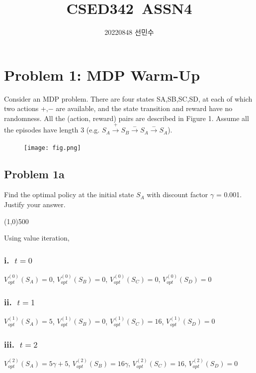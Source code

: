 \documentclass{article}
\title{CSED342\ ASSN4}
\author{20220848 선민수}
\begin{document}
\maketitle

\section*{Problem 1: MDP Warm-Up}
Consider an MDP problem. There are four states {SA,SB,SC,SD}, at each of which two actions {+,−} are available, and the state transition and reward have no randomness. All the (action, reward) pairs are described in Figure 1. Assume all the episodes have length 3 (e.g. $S_A\xrightarrow{+}S_B\xrightarrow{-}S_A\xrightarrow[]{-}S_A$).

\begin{figure}[htp]
    \centering
    \texttt{[image: fig.png]}
\end{figure}

\subsection*{Problem 1a}
Find the optimal policy at the initial state $S_A$ with discount factor $\gamma$ = 0.001. Justify your answer.

\begin{center}
    \line(1,0){500}
\end{center}

Using value iteration,

\subsubsection*{i.$\mbox{ }t=0$}
\begin{center}
    $V_{opt}^{(0)}(S_A)=0$,
    $V_{opt}^{(0)}(S_B)=0$,
    $V_{opt}^{(0)}(S_C)=0$,
    $V_{opt}^{(0)}(S_D)=0$
\end{center}

\subsubsection*{ii.$\mbox{ }t=1$}
\begin{center}
    $V_{opt}^{(1)}(S_A)=5$,
    $V_{opt}^{(1)}(S_B)=0$,
    $V_{opt}^{(1)}(S_C)=16$,
    $V_{opt}^{(1)}(S_D)=0$ 
\end{center}   

\subsubsection*{iii.$\mbox{ }t=2$}
\begin{center}
    $V_{opt}^{(2)}(S_A)=5\gamma+5$,
    $V_{opt}^{(2)}(S_B)=16\gamma$,
    $V_{opt}^{(2)}(S_C)=16$,
    $V_{opt}^{(2)}(S_D)=0$
\end{center}    
\end{document}
